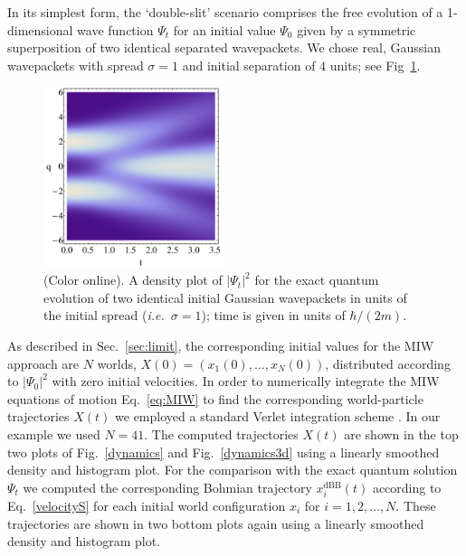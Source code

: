 \documentclass[12pt, aps,pra,amsmath,amssymb,superscriptaddress]{revtex4-2}
\newcommand{\ie}{{\em i.e.}}
\renewcommand{\(}{\left(}
\renewcommand{\)}{\right)}
\newcommand{\blk}{\color{black}}
\begin{document}
In its simplest form, the `double-slit' scenario comprises the free 
evolution of a 1-dimensional \blk wave function $\Psi_t$ for an initial value $\Psi_0$ given by a
symmetric  superposition of two identical separated wavepackets.  
We chose  \blk real, Gaussian wavepackets with spread $\sigma=1$
and initial separation of $4$ units; see Fig~\ref{qm}. 
\begin{figure}[!t]
	\centering
	\includegraphics[width=0.47\textwidth]{qm_density.jpg}
    \caption{\label{qm} (Color online).
    A density plot of $|\Psi_t|^2$ 
    for the exact quantum evolution of two identical initial Gaussian
    wavepackets in units of the initial spread (\ie~$\sigma=1$); \blk time is given in units
of $\hbar/(2m)$.\blk}
\end{figure}
As described in Sec.~\ref{sec:limit}, the corresponding initial values for
the MIW approach are $N$ worlds,
${X}(0)=({x}_1(0),\ldots,{x}_N(0))$, distributed according
to $|\Psi_0|^2$ with zero initial velocities.
In order to numerically integrate the MIW equations of motion Eq.~\ref{eq:MIW}
to find the corresponding world-particle trajectories ${X}(t)$ we employed
 a standard Verlet integration scheme  \cite{verlet}. 
In our example we used $N=41$. The computed trajectories ${X(t)}$
are shown in the top two plots of Fig.~\ref{dynamics}  and
Fig.~\ref{dynamics3d}  using a linearly smoothed
density and histogram plot.  For the comparison with the exact quantum solution $\Psi_t$
we computed the corresponding Bohmian trajectory $x^{\mathrm{dBB}}_i(t)$
according to Eq.~\ref{velocityS} for each initial world configuration $x_i$ for
$i=1,2,\ldots,N$.  These trajectories are shown in two bottom plots again using
a linearly smoothed density and histogram plot.  
\end{document}
